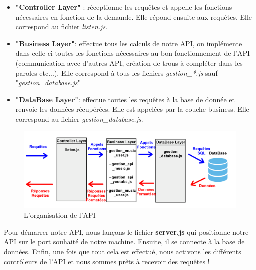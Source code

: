\documentclass[12pt,french]{article}
\begin{document}
\medskip

\begin{itemize}
	\item \textbf{"Controller Layer"} : réceptionne les requêtes et appelle les fonctions nécessaires en fonction de la demande. Elle répond ensuite aux requêtes. Elle correspond au fichier \textit{listen.js}.
	\item \textbf{"Business Layer"}: effectue tous les calculs de notre \gls{API}, on implémente dans celle-ci toutes les fonctions nécessaires au bon fonctionnement de l'\gls{API} (communication avec d'autres \gls{API}, création de trous à compléter dans les paroles etc...). Elle correspond à tous les fichiers \textit{gestion\_*.js} sauf "\textit{gestion\_database.js}"
	\item \textbf{"DataBase Layer"}: effectue toutes les requêtes à la base de donnée et renvoie les données récupérées. Elle est appelées par la couche business. Elle correspond au fichier \textit{gestion\_database.js}.
	
\end{itemize}

\bigskip

\begin{figure}[H]
	\centering
	\includegraphics[scale=0.1]{api_couche.png}
	\caption{
	L'organisation de l'API}  
	\label{figure3}   
\end{figure}

\bigskip

Pour démarrer notre \gls{API}, nous lançons le fichier \textbf{server.js} qui positionne notre \gls{API} sur le port souhaité de notre machine. Ensuite, il se connecte à la base de données. Enfin, une fois que tout cela est effectué, nous activons les différents contrôleurs de l'\gls{API} et nous sommes prêts à recevoir des requêtes !
\end{document}
